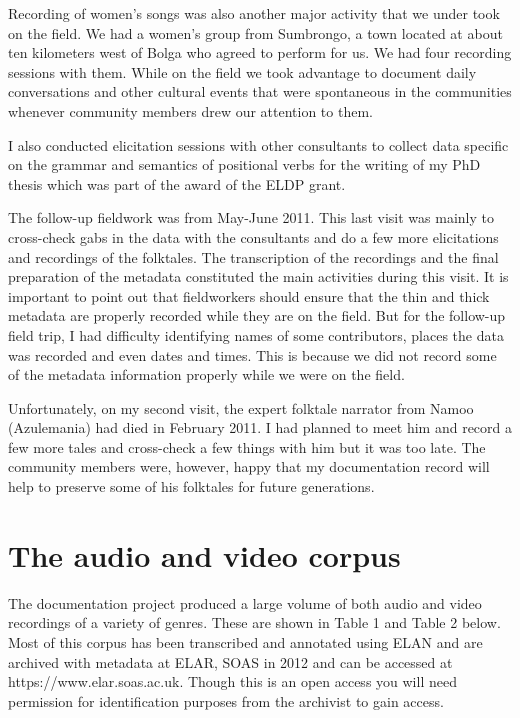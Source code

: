 \documentclass[output=paper,colorlinks,citecolor=brown]{langscibook}
\begin{document}
Recording of women’s songs was also another major activity that we under took on the field. We had a women’s group from Sumbrongo, a town located at about ten kilometers west of Bolga who agreed to perform for us. We had four recording sessions with them. While on the field we took advantage to document daily conversations and other cultural events that were spontaneous in the communities whenever community members drew our attention to them.

I also conducted elicitation sessions with other consultants to collect data specific on the grammar and semantics of positional verbs for the writing of my PhD thesis which was part of the award of the ELDP grant. 

The follow-up fieldwork was from May-June 2011. This last visit was mainly to cross-check gabs in the data with the consultants and do a few more elicitations and recordings of the folktales. The transcription of the recordings and the final preparation of the metadata constituted the main activities during this visit. It is important to point out that fieldworkers should ensure that the thin and thick metadata are properly recorded while they are on the field. But for the follow-up field trip, I had difficulty identifying names of some contributors, places the data was recorded and even dates and times. This is because we did not record some of the metadata information properly while we were on the field.

Unfortunately, on my second visit, the expert folktale narrator from Namoo (Azulemania) had died in February 2011. I had planned to meet him and record a few more tales and cross-check a few things with him but it was too late. The community members were, however, happy that my documentation record will help to preserve some of his folktales for future generations.


\section{The audio and video corpus}
The documentation project produced a large volume of both audio and video recordings of a variety of genres. These are shown in Table 1 and Table 2 below. Most of this corpus has been transcribed and annotated using ELAN and are archived with metadata at ELAR, SOAS in 2012 and can be accessed at    https://www.elar.soas.ac.uk. Though this is an open access you will need permission for identification purposes from the archivist to gain access.
\end{document}
